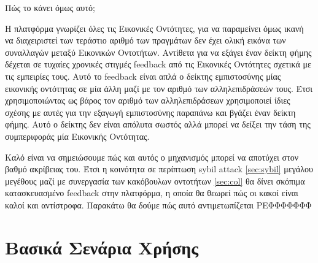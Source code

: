 Πώς το κάνει όμως αυτό;

Η πλατφόρμα γνωρίζει όλες τις Εικονικές Οντότητες, για να παραμείνει όμως ικανή να διαχειριστεί των τεράστιο αριθμό των πραγμάτων δεν έχει ολική εικόνα των συναλλαγών μεταξύ Εικονικών Οντοτήτων. Αντίθετα για να εξάγει έναν δείκτη φήμης δέχεται σε τυχαίες χρονικές στιγμές feedback από τις Εικονικές Οντότητες σχετικά με τις εμπειρίες τους. Αυτό το feedback είναι απλά ο δείκτης εμπιστοσύνης μίας εικονικής οντότητας σε μία άλλη μαζί με τον αριθμό των αλληλεπιδράσεών τους. Έτσι χρησιμοποιώντας ως βάρος τον αριθμό των αλληλεπιδράσεων χρησιμοποιεί ίδιες σχέσης με αυτές για την εξαγωγή εμπιστοσύνης παραπάνω και βγάζει έναν δείκτη φήμης. Αυτό ο δείκτης δεν είναι απόλυτα σωστός αλλά μπορεί να δείξει την τάση της συμπεριφοράς μία Εικονικής Οντότητας.

Καλό είναι να σημειώσουμε πώς και αυτός ο μηχανισμός μπορεί να αποτύχει στον βαθμό ακρίβειας του. Έτσι η κοινότητα σε περίπτωση sybil attack \ref{sec:sybil} μεγάλου μεγέθους μαζί με συνεργασία των κακόβουλων οντοτήτων \ref{sec:col} θα δίνει σκόπιμα κατασκευασμένο feedback στην πλατφόρμα, η οποία θα θεωρεί πώς οι κακοί είναι καλοί και αντίστροφα. Παρακάτω θα δούμε πώς αυτό αντιμετωπίζεται ΡΕΦΦΦΦΦΦΦ %
\newpage
\section{Βασικά Σενάρια Χρήσης}


